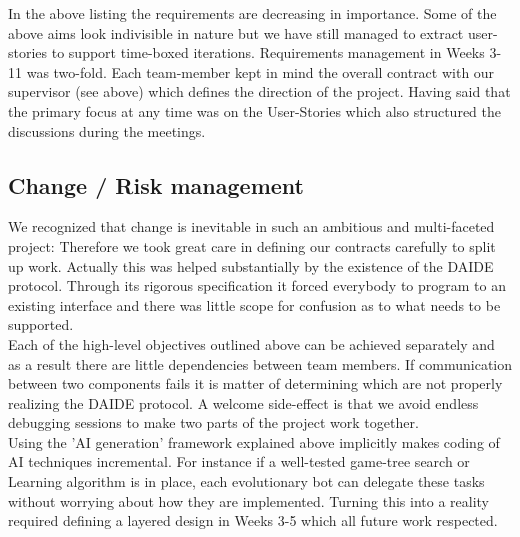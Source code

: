 \documentclass[11pt]{article}
\begin{document}
In the above listing the requirements are decreasing in importance. Some of
the above aims look indivisible in nature but we have still managed to
extract user-stories to support time-boxed iterations. Requirements management
in Weeks 3-11 was two-fold. Each team-member kept in mind the overall contract
with our supervisor (see above) which defines the direction of the project. 
Having said that the primary focus at any time was on the User-Stories which
also structured the discussions during the meetings.

\subsection{Change / Risk management}
We recognized that change is inevitable in such an ambitious and multi-faceted
project: Therefore we took great care in defining our contracts carefully to
split up work. Actually this was helped substantially by the existence of the
DAIDE protocol. Through its rigorous specification it forced everybody to 
program to an existing interface and there was little scope for confusion as
to what needs to be supported. 
\\
Each of the high-level objectives outlined above can be achieved
separately and as a result there are little dependencies between team members.
If communication between two components fails it is matter of determining
which are not properly realizing the DAIDE protocol. A welcome side-effect
is that we avoid endless debugging sessions to make two parts of the project
work together.
\\
Using the 'AI generation' framework explained above implicitly makes coding 
of AI techniques incremental. For instance if a well-tested game-tree search
or Learning algorithm is in place, each evolutionary bot can delegate
these tasks without worrying about how they are implemented. Turning this
into a reality required defining a layered design in Weeks 3-5 which all
future work respected.
\\ 
\end{document}
